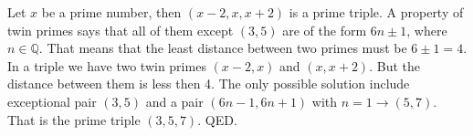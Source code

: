 \documentclass{article}
\begin{document}
Let $x$ be a prime number, then $(x-2,x,x+2)$ is a prime triple.
\newline
\newline
A property of twin primes says that all of them except $(3,5)$ are of the form $6n\pm1$, where $n \in \mathbb{Q}$.
\newline
\newline
That means that the least distance between two primes must be $6\pm1=4$. In a triple we have two twin primes $(x-2,x)$ and $(x,x+2)$. But the distance between them is less then 4. The only possible solution include exceptional pair $(3,5)$ and a pair $(6n-1,6n+1)$ with $n=1 \rightarrow (5,7)$. That is the prime triple $(3,5,7)$.
\newline
QED.
\end{document}
